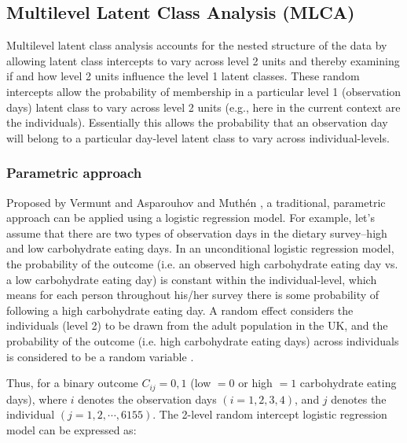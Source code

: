 
\subsection{Multilevel Latent Class Analysis (MLCA)}\vspace{-0.3cm}


Multilevel latent class analysis accounts for the nested structure of the data by allowing latent class intercepts to vary across level 2 units and thereby examining if and how level 2 units influence the level 1 latent classes. These random intercepts allow the probability of membership in a particular level 1 (observation days) latent class to vary across level 2 units (e.g., here in the current context are the individuals). Essentially this allows the probability that an observation day will belong to a
particular day-level latent class to vary across individual-levels.\vspace{-0.5cm}

\subsubsection{Parametric approach}\vspace{-0.3cm}

Proposed by Vermunt \parencite{Vermunt, vermunt2008latent} and Asparouhov and Muth\'en \parencite{muthen2009multilevel},  a traditional, parametric approach can be applied using a logistic regression model. For example, let's assume that there are two types of observation days in the dietary survey--high and low carbohydrate eating days. In an unconditional logistic regression model, the probability of the outcome (i.e. an observed high carbohydrate eating day vs. a low carbohydrate eating day) is constant within the individual-level, which means for each person throughout his/her survey there is some probability of following a high carbohydrate eating day. A random effect considers the individuals (level 2) to be drawn from the adult population in the UK, and the probability of the outcome (i.e. high carbohydrate eating days) across individuals is considered to be a random variable \parencite{snijders2011multilevel}. 

Thus, for a binary outcome $C_{ij} = 0, 1$ (low $=0$ or high $=1$ carbohydrate eating days), where $i$ denotes the observation days $(i = 1, 2, 3, 4)$, and $j$ denotes the individual $(j = 1, 2, \cdots, 6155)$. The 2-level random intercept logistic regression model can be expressed as:\vspace{-0.4cm}


